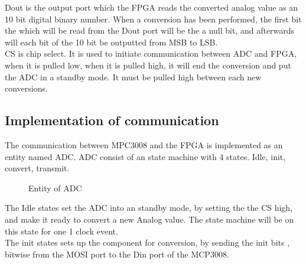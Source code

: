 \documentclass[10pt,a4paper]{article}
\begin{document}
Dout is the output port which the FPGA reads the converted analog value as an 10 bit digital binary number. When a conversion has been performed,  the first bit the which will be read from the Dout port will be the a null bit, and afterwards will each bit of the 10 bit be outputted from MSB to LSB. \\


CS is chip select. It is used to initiate communication between ADC and FPGA, when it is pulled low, when it is pulled high, it will end the conversion and put the ADC in a standby mode.  It must be pulled high between each new conversions. 
 

\subsection{Implementation of communication}

The communication between MPC3008 and the FPGA is implemented as an entity named ADC. ADC consist of an state machine with 4 states. 
Idle, init, convert, transmit. \\
 
 


\begin{figure}[htb]
\centering
{}
\caption{Entity of ADC}
\end{figure}
 
The Idle states set the ADC into an standby mode, by setting the the CS high, and make it ready to convert a new Analog value.  The state machine will be on this state for one 1 clock event. \\

The init states sets up the component for conversion, by sending the init bits , bitwise from the MOSI port to the Din port of the MCP3008. 
\end{document}
